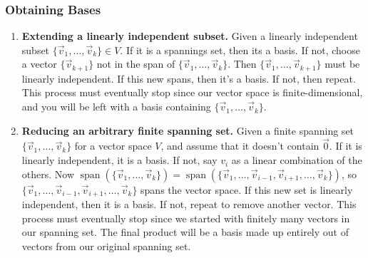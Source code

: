 \documentclass[10pt]{article}
\DeclareMathOperator{\spn}{span}
\theoremstyle{break}
\begin{document}
\subsubsection*{Obtaining Bases}
\begin{enumerate}
    \item \textbf{Extending a linearly independent subset.} Given a linearly independent subset $\{\vec{v}_1, \dots, \vec{v}_k\} \in V$. If it is a spannings set, then its a basis. If not, choose a vector $\{\vec{v}_{k+1}\}$ not in the span of $\{\vec{v}_1,\dots, \vec{v}_k\}$. Then
    $\{\vec{v}_1,\dots, \vec{v}_{k+1}\}$ must be linearly independent. If this new spans, then it's a basis. If not, then repeat. This process must eventually stop since our vector space is
    finite-dimensional, and you will be left with a basis containing $\{\vec{v}_1, \dots, \vec{v}_k\}$.
    \item \textbf{Reducing an arbitrary finite spanning set.} Given a finite spanning set $\{\vec{v}_1, \dots, \vec{v}_k\}$ for a vector space $V$, and assume that it doesn't contain $\vec{0}$. If it is linearly independent, it is a basis. If not, say $v_i$ as a linear combination of the others. 
        Now $\spn(\{\vec{v}_1, \dots, \vec{v}_k\}) = \spn(\{\vec{v}_1, \dots, \vec{v}_{i-1}, \vec{v}_{i+1}, \dots, \vec{v}_k\})$, so $\{\vec{v}_1, \dots, \vec{v}_{i-1}, \vec{v}_{i+1}, \dots, \vec{v}_k\}$ spans the vector space. If this new set is linearly independent, then it is a basis. If not, 
        repeat to remove another vector. This process must eventually stop since we started with finitely many vectors in our spanning set. The final product will be a basis made up entirely out of vectors from our original spanning set.
\end{enumerate}
\end{document}
